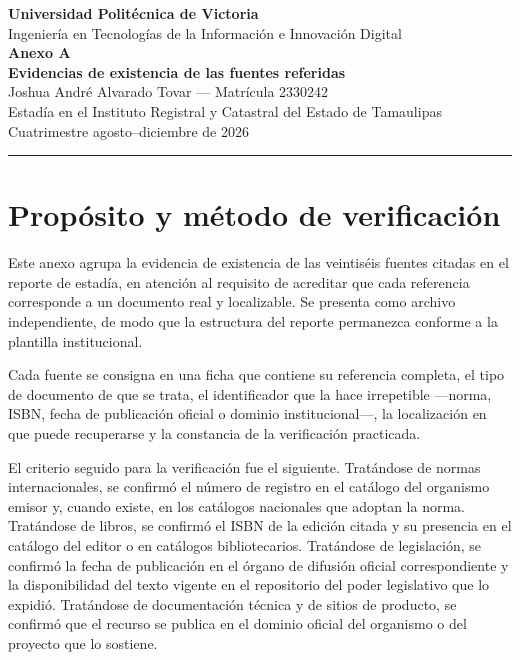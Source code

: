 \documentclass[12pt,letterpaper]{article}
\begin{document}
\begin{center}
  {\large\bfseries Universidad Politécnica de Victoria}\\[2pt]
  {\normalsize Ingeniería en Tecnologías de la Información e Innovación Digital}\\[10pt]
  {\Large\bfseries Anexo A}\\[3pt]
  {\large\bfseries Evidencias de existencia de las fuentes referidas}\\[10pt]
  {\normalsize Joshua André Alvarado Tovar \quad --- \quad Matrícula 2330242}\\[2pt]
  {\footnotesize Estadía en el Instituto Registral y Catastral del Estado de Tamaulipas}\\[2pt]
  {\footnotesize Cuatrimestre agosto--diciembre de 2026}
\end{center}

\vspace{6pt}
\hrule
\vspace{10pt}

\section*{Propósito y método de verificación}

Este anexo agrupa la evidencia de existencia de las veintiséis fuentes citadas en el reporte de estadía, en atención
al requisito de acreditar que cada referencia corresponde a un documento real y localizable. Se presenta como archivo
independiente, de modo que la estructura del reporte permanezca conforme a la plantilla institucional.

Cada fuente se consigna en una ficha que contiene su referencia completa, el tipo de documento de que se trata, el
identificador que la hace irrepetible ---norma, ISBN, fecha de publicación oficial o dominio institucional---, la
localización en que puede recuperarse y la constancia de la verificación practicada.

El criterio seguido para la verificación fue el siguiente. Tratándose de normas internacionales, se confirmó el
número de registro en el catálogo del organismo emisor y, cuando existe, en los catálogos nacionales que adoptan la
norma. Tratándose de libros, se confirmó el ISBN de la edición citada y su presencia en el catálogo del editor o en
catálogos bibliotecarios. Tratándose de legislación, se confirmó la fecha de publicación en el órgano de difusión
oficial correspondiente y la disponibilidad del texto vigente en el repositorio del poder legislativo que lo expidió.
Tratándose de documentación técnica y de sitios de producto, se confirmó que el recurso se publica en el dominio
oficial del organismo o del proyecto que lo sostiene.
\end{document}

